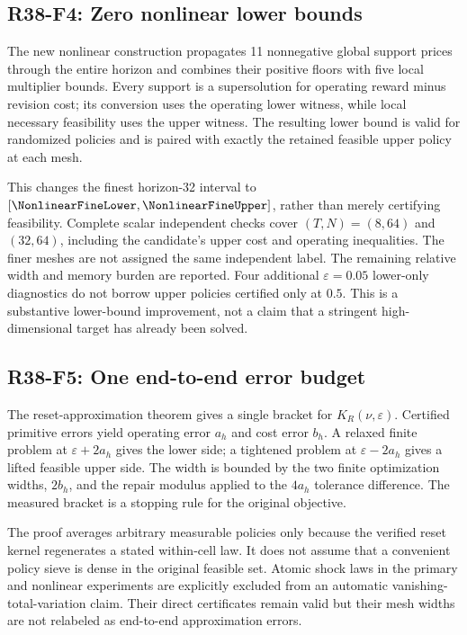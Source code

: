 \subsection{R38-F4: Zero nonlinear lower bounds}
The new nonlinear construction propagates 11 nonnegative global support prices through the entire horizon and combines their positive floors with five local multiplier bounds. Every support is a supersolution for operating reward minus revision cost; its conversion uses the operating lower witness, while local necessary feasibility uses the upper witness. The resulting lower bound is valid for randomized policies and is paired with exactly the retained feasible upper policy at each mesh.

This changes the finest horizon-32 interval to $[\NonlinearFineLower,\NonlinearFineUpper]$, rather than merely certifying feasibility. Complete scalar independent checks cover $(T,N)=(8,64)$ and $(32,64)$, including the candidate's upper cost and operating inequalities. The finer meshes are not assigned the same independent label. The remaining relative width and memory burden are reported. Four additional $\varepsilon=0.05$ lower-only diagnostics do not borrow upper policies certified only at $0.5$. This is a substantive lower-bound improvement, not a claim that a stringent high-dimensional target has already been solved.

\subsection{R38-F5: One end-to-end error budget}
The reset-approximation theorem gives a single bracket for $K_R(\nu,\varepsilon)$. Certified primitive errors yield operating error $a_h$ and cost error $b_h$. A relaxed finite problem at $\varepsilon+2a_h$ gives the lower side; a tightened problem at $\varepsilon-2a_h$ gives a lifted feasible upper side. The width is bounded by the two finite optimization widths, $2b_h$, and the repair modulus applied to the $4a_h$ tolerance difference. The measured bracket is a stopping rule for the original objective.

The proof averages arbitrary measurable policies only because the verified reset kernel regenerates a stated within-cell law. It does not assume that a convenient policy sieve is dense in the original feasible set. Atomic shock laws in the primary and nonlinear experiments are explicitly excluded from an automatic vanishing-total-variation claim. Their direct certificates remain valid but their mesh widths are not relabeled as end-to-end approximation errors.

